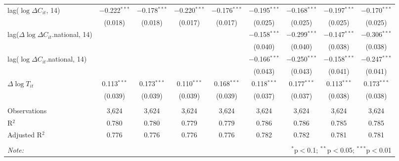 \begin{tabular}{@{\extracolsep{1pt}}lcccccccc}
  lag($\log \Delta C_{it}$, 14) & $-$0.222$^{***}$ & $-$0.178$^{***}$ & $-$0.220$^{***}$ & $-$0.176$^{***}$ & $-$0.195$^{***}$ & $-$0.168$^{***}$ & $-$0.197$^{***}$ & $-$0.170$^{***}$ \\ 
  & (0.018) & (0.018) & (0.017) & (0.017) & (0.025) & (0.025) & (0.025) & (0.025) \\ 
  lag($\Delta \log \Delta C_{it}$.national, 14) &  &  &  &  & $-$0.158$^{***}$ & $-$0.299$^{***}$ & $-$0.147$^{***}$ & $-$0.306$^{***}$ \\ 
  &  &  &  &  & (0.040) & (0.040) & (0.038) & (0.038) \\ 
  lag($\log \Delta C_{it}$.national, 14) &  &  &  &  & $-$0.166$^{***}$ & $-$0.250$^{***}$ & $-$0.158$^{***}$ & $-$0.247$^{***}$ \\ 
  &  &  &  &  & (0.043) & (0.043) & (0.041) & (0.041) \\ 
  $\Delta \log T_{it}$ & 0.113$^{***}$ & 0.173$^{***}$ & 0.110$^{***}$ & 0.168$^{***}$ & 0.118$^{***}$ & 0.177$^{***}$ & 0.113$^{***}$ & 0.173$^{***}$ \\ 
  & (0.039) & (0.039) & (0.039) & (0.039) & (0.037) & (0.037) & (0.038) & (0.038) \\ 
 \hline \\[-1.8ex] 
Observations & 3,624 & 3,624 & 3,624 & 3,624 & 3,624 & 3,624 & 3,624 & 3,624 \\ 
R$^{2}$ & 0.780 & 0.780 & 0.779 & 0.779 & 0.786 & 0.786 & 0.785 & 0.785 \\ 
Adjusted R$^{2}$ & 0.776 & 0.776 & 0.776 & 0.776 & 0.782 & 0.782 & 0.781 & 0.781 \\ 
\hline 
\hline \\[-1.8ex] 
\textit{Note:}  & \multicolumn{8}{r}{$^{*}$p$<$0.1; $^{**}$p$<$0.05; $^{***}$p$<$0.01} \\ 
\end{tabular} 